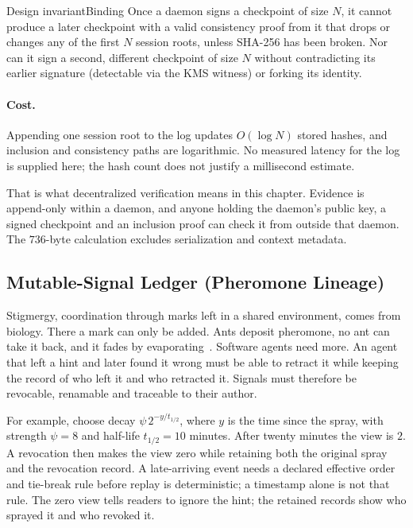 \documentclass[11pt,a4paper]{article}
\theoremstyle{definition}
\theoremstyle{remark}
\begin{document}
\begin{pdclaim}{Design invariant}{Binding}
\setlength{\parskip}{4pt plus 1pt}
\label{prop:forest-bind}
Once a daemon signs a checkpoint of size $N$, it cannot produce a later checkpoint with a valid consistency proof from it that drops or changes any of the first $N$ session roots, unless SHA-256 has been broken. Nor can it sign a second, different checkpoint of size $N$ without contradicting its earlier signature (detectable via the KMS witness) or forking its identity.
\end{pdclaim}

\paragraph{Cost.} Appending one session root to the log updates $O(\log N)$
stored hashes, and inclusion and consistency paths are logarithmic. No
measured latency for the log is supplied here; the hash count does not
justify a millisecond estimate.

That is what decentralized verification means in this chapter. Evidence is append-only within a daemon, and anyone holding the daemon's public key, a signed checkpoint and an inclusion proof can check it from outside that daemon. The $736$-byte
calculation excludes serialization and context metadata.

\subsection{Mutable-Signal Ledger (Pheromone Lineage)}\label{sec:pheromones}

Stigmergy, coordination through marks left in a shared environment, comes from biology. There a mark can only be added. Ants deposit pheromone, no ant can take it back, and it fades by evaporating~. Software agents need more. An agent that left a hint and later found it wrong must be able to retract it while keeping the record of who left it and who retracted it. Signals must therefore be revocable, renamable and traceable to their author.

For example, choose decay $\psi\,2^{-y/t_{1/2}}$, where $y$ is the time since the
spray, with strength $\psi=8$ and half-life $t_{1/2}=10$ minutes. After twenty minutes the view is $2$. A revocation then
makes the view zero while retaining both the original spray and the revocation
record. A late-arriving event needs a declared effective order and tie-break
rule before replay is deterministic; a timestamp alone is not that rule.
The zero view tells readers to ignore the hint; the retained records show who
sprayed it and who revoked it.
\end{document}
